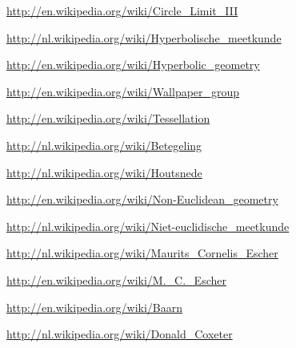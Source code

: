 \documentclass{article}
\begin{document}
\pagebreak

\begin{thebibliography}{9}

\bibitem{}
	\url{http://en.wikipedia.org/wiki/Circle_Limit_III}

\bibitem{}
	\url{http://nl.wikipedia.org/wiki/Hyperbolische_meetkunde}

\bibitem{}
	\url{http://en.wikipedia.org/wiki/Hyperbolic_geometry}

\bibitem{}
	\url{http://en.wikipedia.org/wiki/Wallpaper_group}

\bibitem{}
	\url{http://en.wikipedia.org/wiki/Tessellation}

\bibitem{}
	\url{http://nl.wikipedia.org/wiki/Betegeling}

\bibitem{}
	\url{http://nl.wikipedia.org/wiki/Houtsnede}

\bibitem{}
	\url{http://en.wikipedia.org/wiki/Non-Euclidean_geometry}

\bibitem{}
	\url{http://nl.wikipedia.org/wiki/Niet-euclidische_meetkunde}

\bibitem{}
	\url{http://nl.wikipedia.org/wiki/Maurits_Cornelis_Escher}

\bibitem{}
	\url{http://en.wikipedia.org/wiki/M._C._Escher}

\bibitem{}
	\url{http://en.wikipedia.org/wiki/Baarn}

\bibitem{}
	\url{http://nl.wikipedia.org/wiki/Donald_Coxeter}

	
\end{thebibliography}
\end{document}
